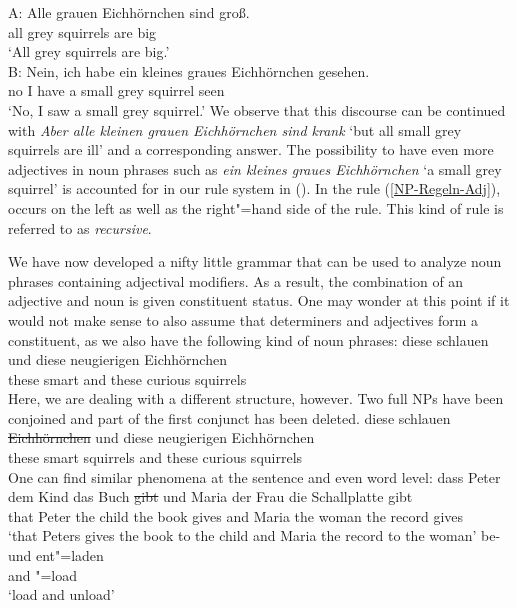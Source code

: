 \ea
\label{Beispiel-Iteration-Adjektive}
\gll A: Alle grauen Eichhörnchen sind groß.\\
     {} all grey squirrels are big\\
\glt {}`All grey squirrels are big.'\\
\gll B: Nein, ich habe ein kleines graues Eichhörnchen gesehen.\\
     {} no I have a small grey squirrel seen\\
\glt {}`No, I saw a small grey squirrel.'
\z
We observe that this discourse can be continued with \emph{Aber alle kleinen grauen Eichhörnchen
  sind krank} `but all small grey squirrels are ill' and a corresponding answer. The possibility
  to have even more adjectives in noun phrases such as \emph{ein kleines graues Eichhörnchen} `a
  small grey squirrel' is accounted for in our rule system in (). In the rule
  (\ref{NP-Regeln-Adj}), \nbar occurs on the left as well as the right"=hand 
  side of the rule. This kind of rule is referred to as \emph{recursive}.

We have now developed a nifty little grammar that can be used to analyze noun phrases containing
adjectival modifiers. As a result, the combination of an adjective and noun is given constituent
status. One may wonder at this point if it would not make sense to also assume that determiners and
adjectives form a constituent, as we also have the following kind of noun phrases: 
\ea
\gll diese schlauen und diese neugierigen Eichhörnchen\\
     these smart    and these curious     squirrels\\
\z
Here, we are dealing with a different structure, however. Two full NPs have been
conjoined and part of the first conjunct has been deleted.
\ea
\gll diese schlauen \st{Eichhörnchen} und diese neugierigen Eichhörnchen\\
     these smart    squirrels         and these curious     squirrels\\
\z
One can find similar phenomena at the sentence and even word level:
\eal
\ex 
\gll dass Peter dem Kind das Buch \st{gibt} und Maria der Frau die Schallplatte gibt\\
     that Peter the child the book gives and Maria the woman the record gives\\
\glt `that Peters gives the book to the child and Maria the record to the woman'
\ex 
\gll be- und ent"=laden\\
     \prfx{} and \prfx{}"=load\\
\glt `load and unload'
\zl


